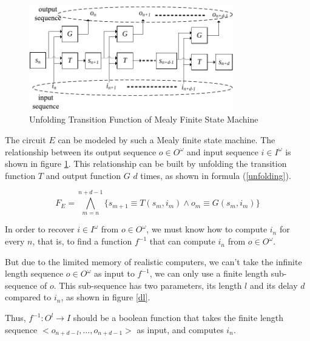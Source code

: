 \documentclass[journal]{IEEEtran}
\begin{document}
\vspace{0.2cm}


\begin{figure}[t]
\centering
\includegraphics[width=3.5in]{mealy}
\caption{Unfolding Transition Function of Mealy Finite State Machine}
\label{mealyfsm_unfolding}
\end{figure}

The circuit $E$ can be modeled by such a Mealy finite state machine.
The relationship between its output sequence $o\in O^{\omega}$ and input sequence $i\in I^{\omega}$ is shown in figure \ref{mealyfsm_unfolding}.
This relationship can be built by unfolding the transition function $T$ and output function $G$ $d$ times,
as shown in formula (\ref{unfolding}).

\begin{equation}\label{unfolding}
F_{E}= \bigwedge_{m=n}^{n+d-1} \Big\{ s_{m+1}\equiv T(s_m,i_m) \wedge  o_m\equiv G(s_m,i_m) \Big\}
\end{equation}

In order to recover $i\in I^{\omega}$ from $o\in O^{\omega}$,
we must know how to compute $i_n$ for every $n$,
that is, to find a function $f^{-1}$ that can compute $i_n$ from $o\in O^{\omega}$.

But due to the limited memory of realistic computers,
we can't take the infinite length sequence $o\in O^{\omega}$ as input to $f^{-1}$,
we can only use a finite length sub-sequence of $o$.
This sub-sequence has two parameters,
its length $l$ and its delay $d$ compared to $i_n$, as shown in figure \ref{dl}.

Thus,
$f^{-1}:O^l\to I$ should be a boolean function that takes the finite length sequence $<o_{n+d-l},\dots , o_{n+d-1} >$ as input,
and computes $i_n$.
\end{document}
